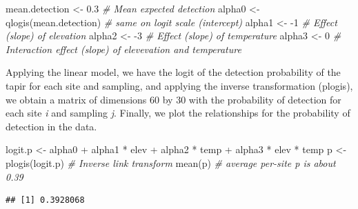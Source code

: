 \documentclass[
]{book}
\newenvironment{Shaded}{\begin{snugshade}}{\end{snugshade}}
\newcommand{\CommentTok}[1]{\textcolor[rgb]{0.56,0.35,0.01}{\textit{#1}}}
\newcommand{\DecValTok}[1]{\textcolor[rgb]{0.00,0.00,0.81}{#1}}
\newcommand{\FloatTok}[1]{\textcolor[rgb]{0.00,0.00,0.81}{#1}}
\newcommand{\FunctionTok}[1]{\textcolor[rgb]{0.00,0.00,0.00}{#1}}
\newcommand{\NormalTok}[1]{#1}
\newcommand{\OtherTok}[1]{\textcolor[rgb]{0.56,0.35,0.01}{#1}}
\newcommand{\SpecialCharTok}[1]{\textcolor[rgb]{0.00,0.00,0.00}{#1}}
\begin{document}
\begin{Shaded}
\begin{Highlighting}[]
\NormalTok{mean.detection }\OtherTok{\textless{}{-}} \FloatTok{0.3}            \CommentTok{\# Mean expected detection}
\NormalTok{alpha0 }\OtherTok{\textless{}{-}} \FunctionTok{qlogis}\NormalTok{(mean.detection) }\CommentTok{\# same on logit scale (intercept)}
\NormalTok{alpha1 }\OtherTok{\textless{}{-}} \SpecialCharTok{{-}}\DecValTok{1}                     \CommentTok{\# Effect (slope) of elevation}
\NormalTok{alpha2 }\OtherTok{\textless{}{-}} \SpecialCharTok{{-}}\DecValTok{3}                     \CommentTok{\# Effect (slope) of temperature}
\NormalTok{alpha3 }\OtherTok{\textless{}{-}} \DecValTok{0}                      \CommentTok{\# Interaction effect (slope) of elevevation and temperature}
\end{Highlighting}
\end{Shaded}

Applying the linear model, we have the logit of the detection probability of the tapir for each site and sampling, and applying the inverse transformation (plogis), we obtain a matrix of dimensions 60 by 30 with the probability of detection for each site \emph{i} and sampling \emph{j}. Finally, we plot the relationships for the probability of detection in the data.

\begin{Shaded}
\begin{Highlighting}[]
\NormalTok{logit.p }\OtherTok{\textless{}{-}}\NormalTok{ alpha0 }\SpecialCharTok{+}\NormalTok{ alpha1 }\SpecialCharTok{*}\NormalTok{ elev }\SpecialCharTok{+}\NormalTok{ alpha2 }\SpecialCharTok{*}\NormalTok{ temp }\SpecialCharTok{+}\NormalTok{ alpha3 }\SpecialCharTok{*}\NormalTok{ elev }\SpecialCharTok{*}\NormalTok{ temp}
\NormalTok{p }\OtherTok{\textless{}{-}} \FunctionTok{plogis}\NormalTok{(logit.p)             }\CommentTok{\# Inverse link transform }
\FunctionTok{mean}\NormalTok{(p)                          }\CommentTok{\# average per{-}site p is about 0.39}
\end{Highlighting}
\end{Shaded}

\begin{verbatim}
## [1] 0.3928068
\end{verbatim}
\end{document}
